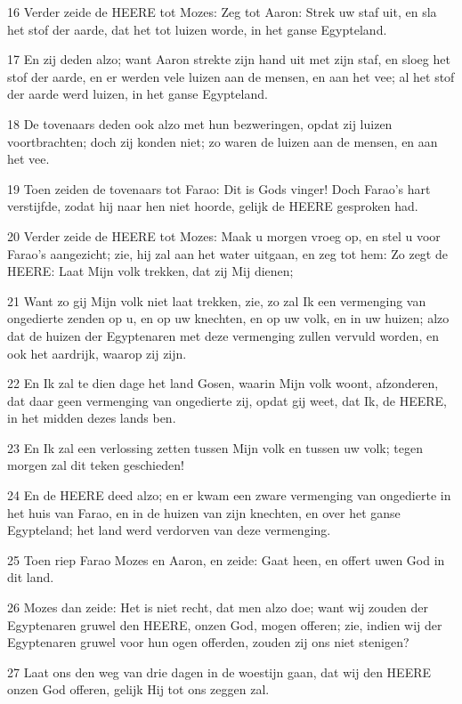 \par 16 Verder zeide de HEERE tot Mozes: Zeg tot Aaron: Strek uw staf uit, en sla het stof der aarde, dat het tot luizen worde, in het ganse Egypteland.
\par 17 En zij deden alzo; want Aaron strekte zijn hand uit met zijn staf, en sloeg het stof der aarde, en er werden vele luizen aan de mensen, en aan het vee; al het stof der aarde werd luizen, in het ganse Egypteland.
\par 18 De tovenaars deden ook alzo met hun bezweringen, opdat zij luizen voortbrachten; doch zij konden niet; zo waren de luizen aan de mensen, en aan het vee.
\par 19 Toen zeiden de tovenaars tot Farao: Dit is Gods vinger! Doch Farao's hart verstijfde, zodat hij naar hen niet hoorde, gelijk de HEERE gesproken had.
\par 20 Verder zeide de HEERE tot Mozes: Maak u morgen vroeg op, en stel u voor Farao's aangezicht; zie, hij zal aan het water uitgaan, en zeg tot hem: Zo zegt de HEERE: Laat Mijn volk trekken, dat zij Mij dienen;
\par 21 Want zo gij Mijn volk niet laat trekken, zie, zo zal Ik een vermenging van ongedierte zenden op u, en op uw knechten, en op uw volk, en in uw huizen; alzo dat de huizen der Egyptenaren met deze vermenging zullen vervuld worden, en ook het aardrijk, waarop zij zijn.
\par 22 En Ik zal te dien dage het land Gosen, waarin Mijn volk woont, afzonderen, dat daar geen vermenging van ongedierte zij, opdat gij weet, dat Ik, de HEERE, in het midden dezes lands ben.
\par 23 En Ik zal een verlossing zetten tussen Mijn volk en tussen uw volk; tegen morgen zal dit teken geschieden!
\par 24 En de HEERE deed alzo; en er kwam een zware vermenging van ongedierte in het huis van Farao, en in de huizen van zijn knechten, en over het ganse Egypteland; het land werd verdorven van deze vermenging.
\par 25 Toen riep Farao Mozes en Aaron, en zeide: Gaat heen, en offert uwen God in dit land.
\par 26 Mozes dan zeide: Het is niet recht, dat men alzo doe; want wij zouden der Egyptenaren gruwel den HEERE, onzen God, mogen offeren; zie, indien wij der Egyptenaren gruwel voor hun ogen offerden, zouden zij ons niet stenigen?
\par 27 Laat ons den weg van drie dagen in de woestijn gaan, dat wij den HEERE onzen God offeren, gelijk Hij tot ons zeggen zal.
